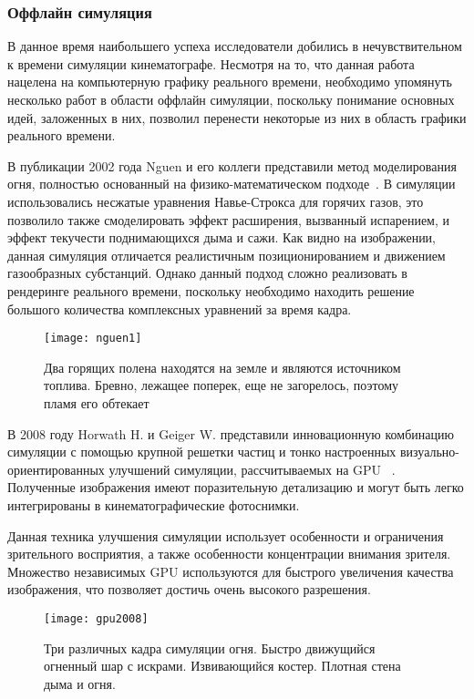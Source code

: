 \subsubsection{Оффлайн симуляция}
В данное время наибольшего успеха исследователи добились в нечувствительном к
времени симуляции кинематографе. Несмотря на то, что данная работа нацелена на
компьютерную графику реального времени, необходимо упомянуть несколько работ в
области оффлайн симуляции, поскольку понимание основных идей, заложенных в них,
позволил перенести некоторые из них в область графики реального времени.

В публикации 2002 года Nguen и его коллеги представили метод моделирования огня,
полностью основанный на физико-математическом подходе~\cite{nguen2002}. В
симуляции использовались несжатые уравнения Навье-Строкса для горячих газов, это
позволило также смоделировать эффект расширения, вызванный испарением, и эффект
текучести поднимающихся дыма и сажи. Как видно на изображении, данная симуляция
отличается реалистичным позиционированием и движением газообразных субстанций.
Однако данный подход сложно реализовать в рендеринге реального времени,
поскольку необходимо находить решение большого количества комплексных уравнений
за время кадра.
\begin{figure}[htb]
	\centering
	\texttt{[image: nguen1]}
	\caption{Два горящих полена находятся на земле и являются источником
 топлива. Бревно, лежащее поперек, еще не загорелось, поэтому пламя его обтекает}
\end{figure}

В 2008 году Horwath H. и Geiger W. представили инновационную комбинацию
симуляции с помощью крупной решетки частиц и тонко настроенных
визуально-ориентированных улучшений симуляции, рассчитываемых на GPU
~\cite{Stock:2008:SWF:1400385.1400457}. Полученные
изображения имеют поразительную детализацию и могут быть легко интегрированы в
кинематографические фотоснимки.

Данная техника улучшения симуляции использует особенности и ограничения
зрительного восприятия, а также особенности концентрации внимания зрителя.
Множество независимых GPU используются для быстрого увеличения качества
изображения, что позволяет достичь очень высокого разрешения.
\begin{figure}[htb]
	\centering
	\texttt{[image: gpu2008]}
	\caption{Три различных кадра симуляции огня. Быстро движущийся огненный
	шар с искрами. Извивающийся костер. Плотная стена дыма и огня.}
\end{figure}

